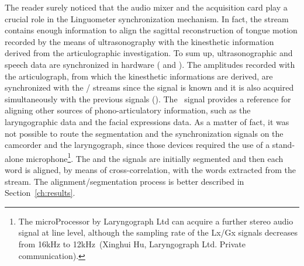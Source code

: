 The reader surely noticed that the audio mixer and the acquisition card play a
crucial role in the Linguometer synchronization mechanism.
In fact, the  stream contains enough information to align the sagittal
reconstruction of tongue motion recorded by the means of ultrasonography with 
the kinesthetic information derived from the articulographic investigation.
To sum up, ultrasonographic and speech data are synchronized in hardware
( and ).
The amplitudes recorded with the articulograph, from which the kinesthetic
informations are derived, are synchronized with the /
streams since the  signal is known and it is also acquired
simultaneously with the previous signals ().
The~ signal provides a reference for aligning other sources of
phono-articulatory information, such as the laryngographic data and the facial
expressions data.
As a matter of fact, it was not possible to route the segmentation and the
synchronization signals on the camcorder and the laryngograph, since those
devices required the use of a stand-alone microphone\footnote{The microProcessor by 
Laryngograph Ltd can acquire a
further stereo audio signal at line level, although the sampling rate of the
Lx/Gx signals decreases from 16kHz to 12kHz~(Xinghui Hu, Laryngograph Ltd.
Private communication).}.
The  and the  signals are initially segmented and
then each word is aligned, by means of cross-correlation, with the words 
extracted from the  stream. The alignment/segmentation process
is better described in Section~\ref{ch:results}.
\pagebreak
